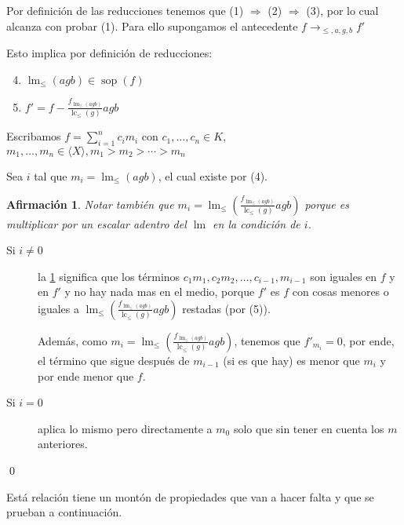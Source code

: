 \documentclass{report}
\theoremstyle{customstyle}
\renewenvironment{proof}[1][\proofname]{{\bfseries #1: }}{\qed} %
\theoremstyle{factstyle}
\newtheorem{fact}{Afirmación}[theorem]
\DeclareMathOperator{\sop}{sop}
\DeclareMathOperator{\lm}{lm}
\DeclareMathOperator{\lc}{lc}
\begin{document}
  \begin{proof}
  Por definición de las reducciones tenemos que (1) $⇒$ (2) $⇒$ (3), por lo cual alcanza con probar (1). Para ello supongamos el antecedente $f →_{≤, a, g, b} f'$

  Esto implica por definición de reducciones:
  \begin{enumerate}
    \setcounter{enumi}{3}
    \item $\lm_≤(agb) ∈ \sop(f)$
    \item $f' = f - \frac{f_{\lm_≤(agb)}}{\lc_≤(g)}agb$
  \end{enumerate}

  Escribamos $f = ∑_{i = 1}^n c_i m_i$ con $c_1, …, c_n ∈ K$, $m_1, …, m_n ∈ ⟨X⟩, m_1 > m_2 > ⋯ > m_n$

  Sea $i$ tal que $m_i = \lm_≤(agb)$, el cual existe por (4).

  \begin{fact}\label{fact:→ achican:3}
    Notar también que $m_i = \lm_≤(\frac{f_{\lm_≤(agb)}}{\lc_≤(g)}agb)$ porque es multiplicar por un escalar adentro del $\lm$ en la condición de $i$.
  \end{fact}
  \begin{description}
    \item[Si $i ≠ 0$] la \cref{fact:→ achican:3} significa que los términos $c_1 m_1, c_2 m_2, …, c_{i-1}, m_{i-1}$ son iguales en $f$ y en $f'$ y no hay nada mas en el medio, porque $f'$ es $f$ con cosas menores o iguales a $\lm_≤(\frac{f_{\lm_≤(agb)}}{\lc_≤(g)}agb)$ restadas (por (5)).

    Además, como $m_i = \lm_≤(\frac{f_{\lm_≤(agb)}}{\lc_≤(g)}agb)$, tenemos que $f'_{m_i} = 0$, por ende, el término que sigue después de $m_{i-1}$ (si es que hay) es menor que $m_i$ y por ende menor que $f$.

    \item[Si $i = 0$] aplica lo mismo pero directamente a $m_0$ solo que sin tener en cuenta los $m$ anteriores.
  \end{description}

\end{proof}

Está relación tiene un montón de propiedades que van a hacer falta y que se prueban a continuación.
\end{document}
